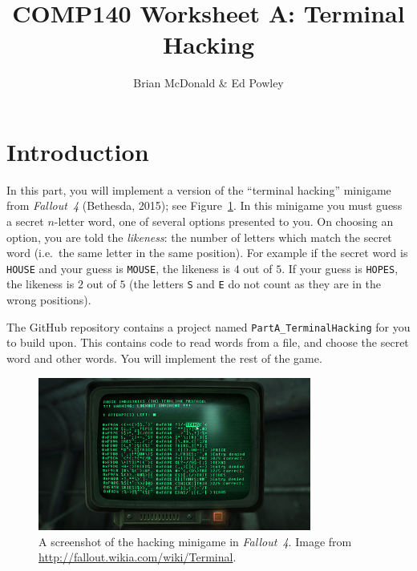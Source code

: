 \documentclass{../../../fal_assignment}
\title{COMP140 Worksheet A: Terminal Hacking}
\author{Brian McDonald \& Ed Powley}
\begin{document}
\maketitle

\section*{Introduction}

In this part, you will implement a version of the ``terminal hacking'' minigame from \emph{Fallout~4} (Bethesda, 2015); see Figure~\ref{fig:fallout_terminal}.
In this minigame you must guess a secret $n$-letter word, one of several options presented to you.
On choosing an option, you are told the \emph{likeness}: the number of letters which match the secret word (i.e.\ the same letter in the same position).
For example if the secret word is \texttt{HOUSE} and your guess is \texttt{MOUSE}, the likeness is $4$ out of $5$.
If your guess is \texttt{HOPES}, the likeness is $2$ out of $5$ (the letters \texttt{S} and \texttt{E} do not count as they are in the wrong positions).

The GitHub repository contains a project named \texttt{PartA\_TerminalHacking} for you to build upon.
This contains code to read words from a file, and choose the secret word and other words.
You will implement the rest of the game.


\begin{figure}[!h]
  	\centering
	\includegraphics[width=0.8\textwidth]{fallout_terminal.jpg}
	\caption{A screenshot of the hacking minigame in \emph{Fallout~4}.
		Image from \protect\url{http://fallout.wikia.com/wiki/Terminal}.}
	\label{fig:fallout_terminal}
\end{figure}

\section{} \label{core-a-first}
\end{document}
